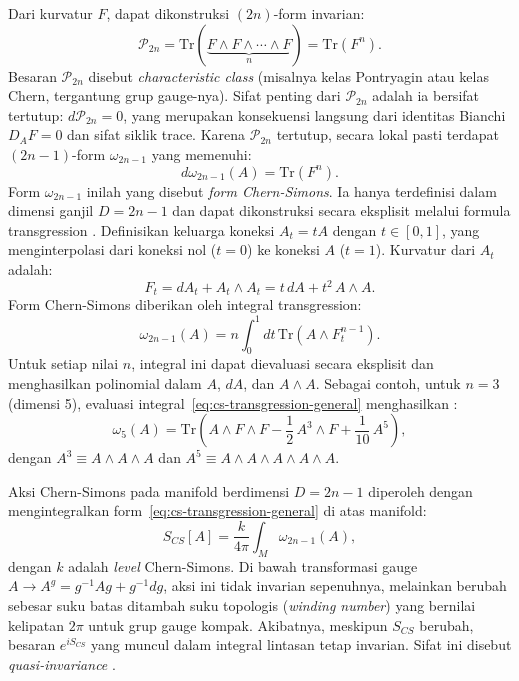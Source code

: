 Dari kurvatur $F$, dapat dikonstruksi $(2n)$-form invarian:
\begin{equation}\label{eq:chern-char}
    \mathcal{P}_{2n} = \mathrm{Tr}(\underbrace{F \wedge F \wedge \cdots \wedge F}_{n}) = \mathrm{Tr}(F^n).
\end{equation}
Besaran $\mathcal{P}_{2n}$ disebut \textit{characteristic class} (misalnya kelas Pontryagin atau kelas Chern, tergantung grup gauge-nya). Sifat penting dari $\mathcal{P}_{2n}$ adalah ia bersifat tertutup: $d\mathcal{P}_{2n} = 0$, yang merupakan konsekuensi langsung dari identitas Bianchi $D_AF = 0$ dan sifat siklik trace. Karena $\mathcal{P}_{2n}$ tertutup, secara lokal pasti terdapat $(2n-1)$-form $\omega_{2n-1}$ yang memenuhi:
\begin{equation}\label{eq:cs-defining}
    d\omega_{2n-1}(A) = \mathrm{Tr}(F^n).
\end{equation}
Form $\omega_{2n-1}$ inilah yang disebut \textit{form Chern-Simons}. Ia hanya terdefinisi dalam dimensi ganjil $D = 2n - 1$ dan dapat dikonstruksi secara eksplisit melalui formula transgression \cite{mora2006transgression, izaurieta2006transgression}. Definisikan keluarga koneksi $A_t = tA$ dengan $t \in [0,1]$, yang menginterpolasi dari koneksi nol ($t = 0$) ke koneksi $A$ ($t = 1$). Kurvatur dari $A_t$ adalah:
\begin{equation}\label{eq:curvature-interp}
    F_t = dA_t + A_t \wedge A_t = t\,dA + t^2\, A \wedge A.
\end{equation}
Form Chern-Simons diberikan oleh integral transgression:
\begin{equation}\label{eq:cs-transgression-general}
    \omega_{2n-1}(A) = n\int_0^1 dt\, \mathrm{Tr}(A \wedge F_t^{n-1}).
\end{equation}
Untuk setiap nilai $n$, integral ini dapat dievaluasi secara eksplisit dan menghasilkan polinomial dalam $A$, $dA$, dan $A \wedge A$. Sebagai contoh, untuk $n = 3$ (dimensi 5), evaluasi integral~\eqref{eq:cs-transgression-general} menghasilkan \cite{zanelli2005lecture}:
\begin{equation}\label{eq:cs-5d}
    \omega_5(A) = \mathrm{Tr}\!\left(A \wedge F \wedge F - \frac{1}{2}\, A^3 \wedge F + \frac{1}{10}\, A^5\right),
\end{equation}
dengan $A^3 \equiv A \wedge A \wedge A$ dan $A^5 \equiv A \wedge A \wedge A \wedge A \wedge A$.

Aksi Chern-Simons pada manifold berdimensi $D = 2n - 1$ diperoleh dengan mengintegralkan form~\eqref{eq:cs-transgression-general} di atas manifold:
\begin{equation}\label{eq:cs-action-general}
    S_{CS}[A] = \frac{k}{4\pi}\int_M \omega_{2n-1}(A),
\end{equation}
dengan $k$ adalah \textit{level} Chern-Simons. Di bawah transformasi gauge $A \to A^g = g^{-1}Ag + g^{-1}dg$, aksi ini tidak invarian sepenuhnya, melainkan berubah sebesar suku batas ditambah suku topologis (\textit{winding number}) yang bernilai kelipatan $2\pi$ untuk grup gauge kompak. Akibatnya, meskipun $S_{CS}$ berubah, besaran $e^{iS_{CS}}$ yang muncul dalam integral lintasan tetap invarian. Sifat ini disebut \textit{quasi-invariance} \cite{zanelli2005lecture}.


